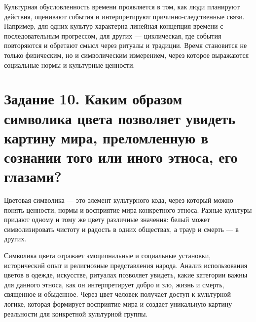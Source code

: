 \documentclass[14pt,a4paper]{extarticle}
\begin{document}
Культурная обусловленность времени проявляется в том, как люди планируют
действия, оценивают события и интерпретируют причинно-следственные связи.
Например, для одних культур характерна линейная концепция времени с
последовательным прогрессом, для других — циклическая, где события повторяются
и обретают смысл через ритуалы и традиции. Время становится не только
физическим, но и символическим измерением, через которое выражаются социальные
нормы и культурные ценности.

\section{Задание 10. Каким образом символика цвета позволяет увидеть картину мира, преломленную в сознании того или иного этноса, его глазами?}
\begin{sloppypar}
Цветовая символика — это элемент культурного кода, через который можно понять
    ценности, нормы и восприятие мира конкретного этноса. Разные культуры
    придают одному и тому же цвету различные значения: белый может
    символизировать чистоту и радость в одних обществах, а траур и смерть — в
    других.

    Символика цвета отражает эмоциональные и социальные установки, исторический
    опыт и религиозные представления народа. Анализ использования цветов в
    одежде, искусстве, ритуалах позволяет увидеть, какие категории важны для
    данного этноса, как он интерпретирует добро и зло, жизнь и смерть,
    священное и обыденное. Через цвет человек получает доступ к культурной
    логике, которая формирует восприятие мира и создает уникальную картину
    реальности для конкретной культурной группы.
\end{sloppypar}
\end{document}
